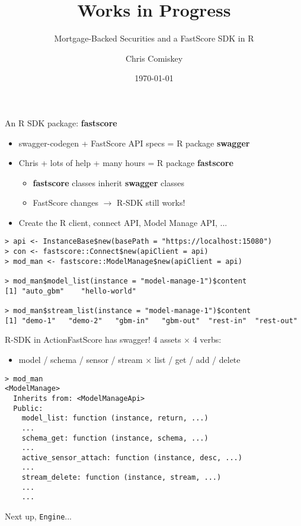 \documentclass{beamer}
\institute{Open Data Group}
\title{Works in Progress}
\subtitle{Mortgage-Backed Securities and a FastScore SDK in R}
\author{Chris Comiskey}
\date{\today}
\begin{document}
\begin{frame}
  \titlepage
\end{frame}

\begin{frame}[fragile]{An R SDK package: {\bf fastscore}}{}
  \begin{itemize}
  \addtolength{\itemsep}{0.5\baselineskip}
  \item swagger-codegen + FastScore API specs = R package {\bf swagger}     
  \item Chris + lots of help + many hours = R package {\bf fastscore}
      \begin{itemize}
      \addtolength{\itemsep}{0.5\baselineskip}
      \item {\bf fastscore} classes inherit {\bf swagger} classes
      \item FastScore changes $\rightarrow$ R-SDK still works!
      \end{itemize}
  \item Create the R client, connect API, Model Manage API, ...
  \end{itemize}
  
  \begin{verbatim}
> api <- InstanceBase$new(basePath = "https://localhost:15080")
> con <- fastscore::Connect$new(apiClient = api)
> mod_man <- fastscore::ModelManage$new(apiClient = api)  

> mod_man$model_list(instance = "model-manage-1")$content 
[1] "auto_gbm"    "hello-world"

> mod_man$stream_list(instance = "model-manage-1")$content
[1] "demo-1"   "demo-2"   "gbm-in"   "gbm-out"  "rest-in"  "rest-out"
\end{verbatim}
\end{frame}

\begin{frame}[fragile]{R-SDK in Action}{FastScore has swagger!}
4 assets $\times$ 4 verbs: 
\begin{itemize}
\item model / schema / sensor / stream $\times$ list / get / add / delete
\end{itemize}
\begin{verbatim}
> mod_man
<ModelManage>
  Inherits from: <ModelManageApi>
  Public:
    model_list: function (instance, return, ...) 
    ...
    schema_get: function (instance, schema, ...) 
    ...
    active_sensor_attach: function (instance, desc, ...) 
    ...
    stream_delete: function (instance, stream, ...) 
    ...
    ...
\end{verbatim}
Next up, \verb|Engine|...
    
\end{frame}
\end{document}
